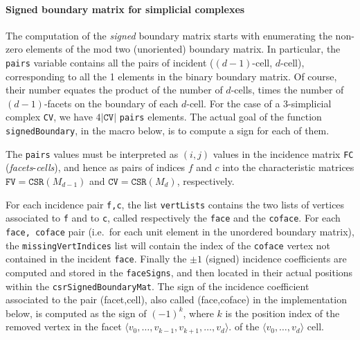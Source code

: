 \documentclass[11pt,oneside]{article}	%
\begin{document}
\paragraph{Signed boundary matrix for simplicial complexes}

The computation of the \emph{signed} boundary matrix starts with enumerating the non-zero 
elements of the mod two (unoriented) boundary matrix. In particular, the \texttt{pairs} variable 
contains all the pairs of incident ($(d-1)$-cell, $d$-cell), corresponding to all
the 1 elements in the binary boundary matrix. Of course, their number equates the product
of the number of $d$-cells, times the number of $(d-1)$-facets on the boundary of each $d$-cell.
For the case of a 3-simplicial complex \texttt{CV}, we have $4|\texttt{CV}|$ \texttt{pairs}
elements.  The actual goal of the function \texttt{signedBoundary}, in the macro below, is to compute a sign for
each of them.

The \texttt{pairs} values must be interpreted as $(i,j)$ values in the incidence matrix \texttt{FC} 
(\emph{facets}-\emph{cells}), and hence as pairs of indices $f$ and $c$ into the characteristic 
matrices $\texttt{FV}=\texttt{CSR}(M_{d-1})$ and $\texttt{CV}=\texttt{CSR}(M_{d})$, respectively.

For each incidence pair \texttt{f,c}, the list \texttt{vertLists}  contains the two lists of 
vertices associated to \texttt{f} and to \texttt{c}, called respectively the \texttt{face} and 
the \texttt{coface}. For each \texttt{face, coface} pair (i.e.~for each unit element in the unordered 
boundary matrix), the \texttt{missingVertIndices} list will contain the index of the \texttt{coface} 
vertex not contained in the incident \texttt{face}. 
Finally the $\pm 1$ (signed) incidence coefficients are computed and stored in the \texttt{faceSigns},
and then located in their actual positions within the \texttt{csrSignedBoundaryMat}.
The sign of the incidence coefficient associated to the pair (facet,cell), also called (face,coface)
in the implementation below, is computed as the sign of $(-1)^k$, where $k$ is the position index of the removed
vertex in the facet $\langle v_0, \ldots, v_{k-1}, v_{k+1}, \ldots, v_d \rangle$. of the 
$\langle v_0, \ldots, v_d \rangle$ cell.
\end{document}
